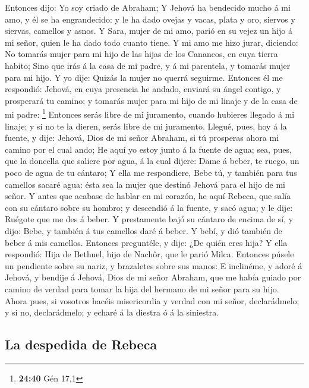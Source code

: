  Entonces dijo: Yo soy criado de Abraham; 
Y Jehová ha bendecido mucho á mi amo, y él se ha engrandecido: y le ha
dado ovejas y vacas, plata y oro, siervos y siervas, camellos y asnos.
 Y Sara, mujer de mi amo, parió en su vejez un hijo á mi
señor, quien le ha dado todo cuanto tiene.  Y mi amo me
hizo jurar, diciendo: No tomarás mujer para mi hijo de las hijas de los
Cananeos, en cuya tierra habito;  Sino que irás á la casa
de mi padre, y á mi parentela, y tomarás mujer para mi hijo.
 Y yo dije: Quizás la mujer no querrá seguirme.
 Entonces él me respondió: Jehová, en cuya presencia he
andado, enviará su ángel contigo, y prosperará tu camino; y tomarás
mujer para mi hijo de mi linaje y de la casa de mi padre: \footnote{\textbf{24:40}
  Gén 17,1}  Entonces serás libre de mi juramento, cuando
hubieres llegado á mi linaje; y si no te la dieren, serás libre de mi
juramento.  Llegué, pues, hoy á la fuente, y dije:
Jehová, Dios de mi señor Abraham, si tú prosperas ahora mi camino por el
cual ando;  He aquí yo estoy junto á la fuente de agua;
sea, pues, que la doncella que saliere por agua, á la cual dijere: Dame
á beber, te ruego, un poco de agua de tu cántaro;  Y ella
me respondiere, Bebe tú, y también para tus camellos sacaré agua: ésta
sea la mujer que destinó Jehová para el hijo de mi señor.
 Y antes que acabase de hablar en mi corazón, he aquí
Rebeca, que salía con su cántaro sobre su hombro; y descendió á la
fuente, y sacó agua; y le dije: Ruégote que me des á beber.
 Y prestamente bajó su cántaro de encima de sí, y dijo:
Bebe, y también á tus camellos daré á beber. Y bebí, y dió también de
beber á mis camellos.  Entonces preguntéle, y dije: ¿De
quién eres hija? Y ella respondió: Hija de Bethuel, hijo de Nachôr, que
le parió Milca. Entonces púsele un pendiente sobre su nariz, y
brazaletes sobre sus manos:  E inclinéme, y adoré á
Jehová, y bendije á Jehová, Dios de mi señor Abraham, que me había
guiado por camino de verdad para tomar la hija del hermano de mi señor
para su hijo.  Ahora pues, si vosotros hacéis
misericordia y verdad con mi señor, declarádmelo; y si no, declarádmelo;
y echaré á la diestra ó á la siniestra.

\hypertarget{la-despedida-de-rebeca}{%
\subsection{La despedida de Rebeca}\label{la-despedida-de-rebeca}}

